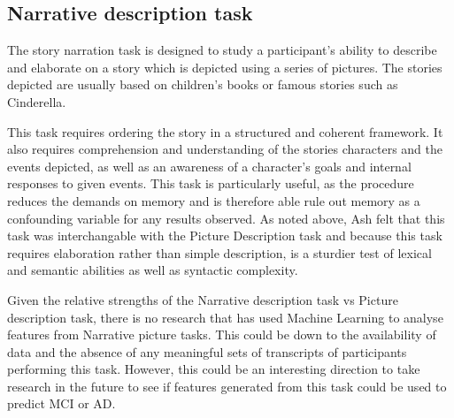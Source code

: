 \documentclass[a4paper]{article}
\begin{document}
\subsection{Narrative description task}
The story narration task is designed to study a participant's ability to describe and elaborate on a story which is depicted using a series of pictures. The stories depicted are usually based on children's books or famous stories such as Cinderella. \cite{Fraser2014}\newline
\par
This task requires ordering the story in a structured and coherent framework. It also requires comprehension and understanding of the stories characters and the events depicted, as well as an awareness of a character's goals and internal responses to given events. This task is particularly useful, as the procedure reduces the demands on memory and is therefore able rule out memory as a confounding variable for any results observed. As noted above, Ash \cite{Ash2012} felt that this task was interchangable with the Picture Description task and because this task requires elaboration rather than simple description, is a sturdier test of lexical and semantic abilities as well as syntactic complexity. \cite{DeLira2011} \newline
\par
Given the relative strengths of the Narrative description task vs Picture description task, there is no research that has used Machine Learning to analyse features from Narrative picture tasks. This could be down to the availability of data and the absence of any meaningful sets of transcripts of participants performing this task. However, this could be an interesting direction to take research in the future to see if features generated from this task could be used to predict MCI or AD.  \newline
\par
\end{document}
